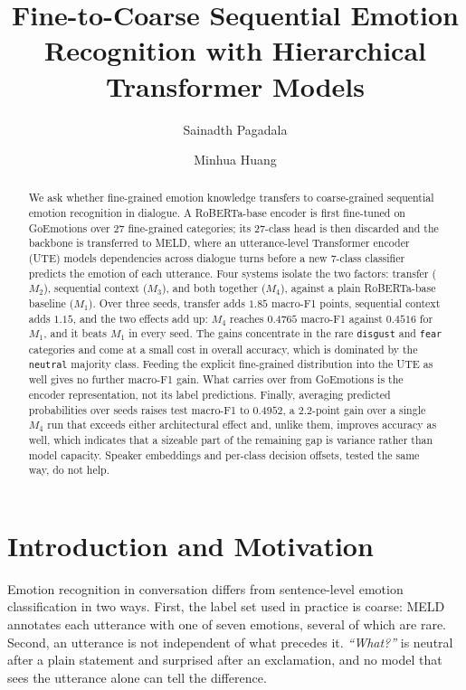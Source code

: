 \documentclass[sigconf,nonacm]{acmart}
\title[Fine-to-Coarse Sequential Emotion Recognition]{Fine-to-Coarse Sequential Emotion Recognition with Hierarchical Transformer Models}
\author{Sainadth Pagadala}
\affiliation{%
  \department{College of Engineering and Computer Science}
  \institution{Texas A\&M University--Corpus Christi}
  \city{Corpus Christi}
  \state{TX}
  \postcode{78412}
  \country{USA}}
\author{Minhua Huang}
\affiliation{%
  \department{College of Engineering and Computer Science}
  \institution{Texas A\&M University--Corpus Christi}
  \city{Corpus Christi}
  \state{TX}
  \postcode{78412}
  \country{USA}}
\begin{document}
\begin{abstract}
We ask whether fine-grained emotion knowledge transfers to coarse-grained sequential
emotion recognition in dialogue. A RoBERTa-base encoder is first fine-tuned on GoEmotions
over 27 fine-grained categories; its 27-class head is then discarded and the backbone is
transferred to MELD, where an utterance-level Transformer encoder (UTE) models
dependencies across dialogue turns before a new 7-class classifier predicts the emotion of
each utterance. Four systems isolate the two factors: transfer ($M_2$), sequential context
($M_3$), and both together ($M_4$), against a plain RoBERTa-base baseline ($M_1$). Over
three seeds, transfer adds $1.85$ macro-F1 points, sequential context adds $1.15$, and the
two effects add up: $M_4$ reaches $0.4765$ macro-F1 against $0.4516$ for $M_1$, and it
beats $M_1$ in every seed. The gains concentrate in the rare
\texttt{disgust} and \texttt{fear} categories and come at a small cost in overall accuracy,
which is dominated by the \texttt{neutral} majority class. Feeding the explicit
fine-grained distribution into the UTE as well gives no further macro-F1 gain. What carries
over from GoEmotions is the encoder representation, not its label predictions. Finally,
averaging predicted probabilities over seeds raises test macro-F1 to $0.4952$, a
$2.2$-point gain over a single $M_4$ run that exceeds either architectural effect and,
unlike them, improves accuracy as well, which indicates that a sizeable part of the
remaining gap is variance rather than model capacity. Speaker embeddings and per-class
decision offsets, tested the same way, do not help.
\end{abstract}
\maketitle

\section{Introduction and Motivation}
Emotion recognition in conversation differs from sentence-level emotion classification in
two ways. First, the label set used in practice is coarse: MELD annotates each utterance
with one of seven emotions, several of which are rare. Second, an utterance is not
independent of what precedes it. \emph{``What?''} is neutral after a plain statement and
surprised after an exclamation, and no model that sees the utterance alone can tell the
difference.
\end{document}

